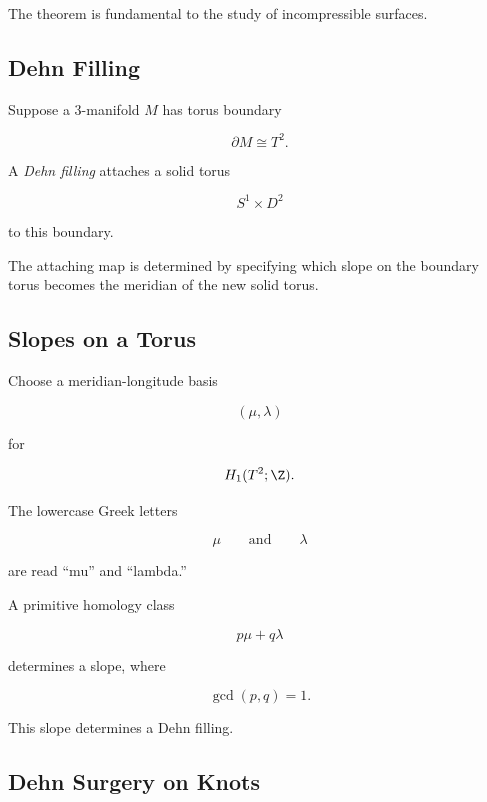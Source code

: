 The theorem is fundamental to the study of incompressible surfaces.

\subsection{Dehn Filling}
\label{subsec:dehn-filling}

Suppose a \(3\)-manifold \(M\) has torus boundary

\[
\partial M\cong T^2.
\]

A \emph{Dehn filling} attaches a solid torus

\[
S^1\times D^2
\]

to this boundary.

The attaching map is determined by specifying which slope on the boundary
torus becomes the meridian of the new solid torus.

\subsection{Slopes on a Torus}
\label{subsec:slopes-torus}

Choose a meridian-longitude basis

\[
\boxed{
(\mu,\lambda)
}
\]

for

\[
H_1(T^2;\Z).
\]

The lowercase Greek letters

\[
\mu
\qquad\text{and}\qquad
\lambda
\]

are read ``mu'' and ``lambda.''

A primitive homology class

\[
\boxed{
p\mu+q\lambda
}
\]

determines a slope, where

\[
\gcd(p,q)=1.
\]

This slope determines a Dehn filling.

\subsection{Dehn Surgery on Knots}
\label{subsec:dehn-surgery-knots}

